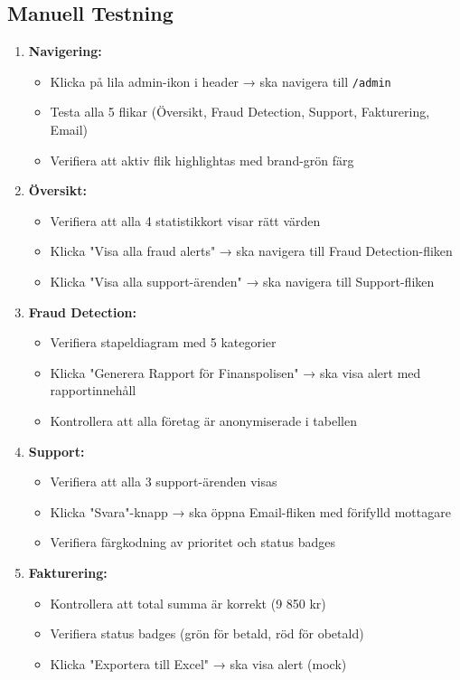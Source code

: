 \documentclass[12pt,a4paper]{article}
\begin{document}
\subsection{Manuell Testning}
\begin{enumerate}
  \item \textbf{Navigering:}
  \begin{itemize}
    \item Klicka på lila admin-ikon i header → ska navigera till \texttt{/admin}
    \item Testa alla 5 flikar (Översikt, Fraud Detection, Support, Fakturering, Email)
    \item Verifiera att aktiv flik highlightas med brand-grön färg
  \end{itemize}
  
  \item \textbf{Översikt:}
  \begin{itemize}
    \item Verifiera att alla 4 statistikkort visar rätt värden
    \item Klicka "Visa alla fraud alerts" → ska navigera till Fraud Detection-fliken
    \item Klicka "Visa alla support-ärenden" → ska navigera till Support-fliken
  \end{itemize}
  
  \item \textbf{Fraud Detection:}
  \begin{itemize}
    \item Verifiera stapeldiagram med 5 kategorier
    \item Klicka "Generera Rapport för Finanspolisen" → ska visa alert med rapportinnehåll
    \item Kontrollera att alla företag är anonymiserade i tabellen
  \end{itemize}
  
  \item \textbf{Support:}
  \begin{itemize}
    \item Verifiera att alla 3 support-ärenden visas
    \item Klicka "Svara"-knapp → ska öppna Email-fliken med förifylld mottagare
    \item Verifiera färgkodning av prioritet och status badges
  \end{itemize}
  
  \item \textbf{Fakturering:}
  \begin{itemize}
    \item Kontrollera att total summa är korrekt (9 850 kr)
    \item Verifiera status badges (grön för betald, röd för obetald)
    \item Klicka "Exportera till Excel" → ska visa alert (mock)
  \end{itemize}
  

\end{enumerate}
\end{document}
